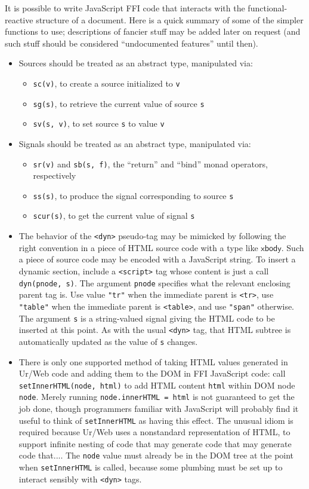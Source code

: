 \documentclass{article}
\newcommand{\cd}[1]{\texttt{#1}}
\newcommand{\mt}[1]{\mathsf{#1}}
\begin{document}
It is possible to write JavaScript FFI code that interacts with the functional-reactive structure of a document.  Here is a quick summary of some of the simpler functions to use; descriptions of fancier stuff may be added later on request (and such stuff should be considered ``undocumented features'' until then).

\begin{itemize}
\item Sources should be treated as an abstract type, manipulated via:
  \begin{itemize}
  \item \cd{sc(v)}, to create a source initialized to \cd{v}
  \item \cd{sg(s)}, to retrieve the current value of source \cd{s}
  \item \cd{sv(s, v)}, to set source \cd{s} to value \cd{v}
  \end{itemize}

\item Signals should be treated as an abstract type, manipulated via:
  \begin{itemize}
  \item \cd{sr(v)} and \cd{sb(s, f)}, the ``return'' and ``bind'' monad operators, respectively
  \item \cd{ss(s)}, to produce the signal corresponding to source \cd{s}
  \item \cd{scur(s)}, to get the current value of signal \cd{s}
  \end{itemize}

\item The behavior of the \cd{<dyn>} pseudo-tag may be mimicked by following the right convention in a piece of HTML source code with a type like $\mt{xbody}$.  Such a piece of source code may be encoded with a JavaScript string.  To insert a dynamic section, include a \cd{<script>} tag whose content is just a call \cd{dyn(pnode, s)}.  The argument \cd{pnode} specifies what the relevant enclosing parent tag is.  Use value \cd{"tr"} when the immediate parent is \cd{<tr>}, use \cd{"table"} when the immediate parent is \cd{<table>}, and use \cd{"span"} otherwise.  The argument \cd{s} is a string-valued signal giving the HTML code to be inserted at this point.  As with the usual \cd{<dyn>} tag, that HTML subtree is automatically updated as the value of \cd{s} changes.

\item There is only one supported method of taking HTML values generated in Ur/Web code and adding them to the DOM in FFI JavaScript code: call \cd{setInnerHTML(node, html)} to add HTML content \cd{html} within DOM node \cd{node}.  Merely running \cd{node.innerHTML = html} is not guaranteed to get the job done, though programmers familiar with JavaScript will probably find it useful to think of \cd{setInnerHTML} as having this effect.  The unusual idiom is required because Ur/Web uses a nonstandard representation of HTML, to support infinite nesting of code that may generate code that may generate code that....  The \cd{node} value must already be in the DOM tree at the point when \cd{setInnerHTML} is called, because some plumbing must be set up to interact sensibly with \cd{<dyn>} tags. 


\end{itemize}
\end{document}
